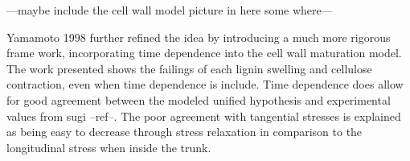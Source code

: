 ---maybe include the cell wall model picture in here some where---

Yamamoto 1998 further refined the idea by introducing a much more rigorous frame
work, incorporating time dependence into the cell wall maturation model. The
work presented shows the failings of each lignin swelling and cellulose
contraction, even when time dependence is include. Time dependence does allow
for good agreement between the modeled unified hypothesis and experimental
values from sugi --ref--. The poor agreement with tangential stresses is
explained as being easy to decrease through stress relaxation in comparison to
the longitudinal stress when inside the trunk.

